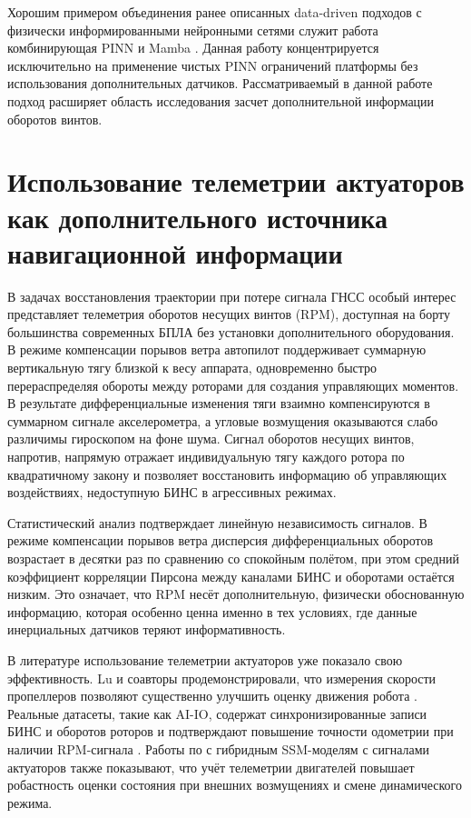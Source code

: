 Хорошим примером объединения ранее описанных data-driven подходов с физически информированными нейронными сетями служит работа комбинирующая PINN и Mamba \cite{HangZhou2026}. Данная работу концентрируется исключительно на применение чистых PINN ограничений платформы без использования дополнительных датчиков. Рассматриваемый в данной работе подход расширяет область исследования засчет дополнительной информации оборотов винтов. 


\section{Использование телеметрии актуаторов как дополнительного источника навигационной информации}
\label{sec:1.6}

В задачах восстановления траектории при потере сигнала ГНСС особый интерес представляет телеметрия оборотов несущих винтов (RPM), доступная на борту большинства современных БПЛА без установки дополнительного оборудования. В режиме компенсации порывов ветра автопилот поддерживает суммарную вертикальную тягу близкой к весу аппарата, одновременно быстро перераспределяя обороты между роторами для создания управляющих моментов. В результате дифференциальные изменения тяги взаимно компенсируются в суммарном сигнале акселерометра, а угловые возмущения оказываются слабо различимы гироскопом на фоне шума. Сигнал оборотов несущих винтов, напротив, напрямую отражает индивидуальную тягу каждого ротора по квадратичному закону и позволяет восстановить информацию об управляющих воздействиях, недоступную БИНС в агрессивных режимах.

Статистический анализ подтверждает линейную независимость сигналов. В режиме компенсации порывов ветра дисперсия дифференциальных оборотов возрастает в десятки раз по сравнению со спокойным полётом, при этом средний коэффициент корреляции Пирсона между каналами БИНС и оборотами остаётся низким. Это означает, что RPM несёт дополнительную, физически обоснованную информацию, которая особенно ценна именно в тех условиях, где данные инерциальных датчиков теряют информативность.

В литературе использование телеметрии актуаторов уже показало свою эффективность. Lu и соавторы продемонстрировали, что измерения скорости пропеллеров позволяют существенно улучшить оценку движения робота \cite{Lu2022rpm}. Реальные датасеты, такие как AI-IO, содержат синхронизированные записи БИНС и оборотов роторов и подтверждают повышение точности одометрии при наличии RPM-сигнала \cite{aiio2026}. Работы по с гибридным SSM-моделям с сигналами актуаторов также показывают, что учёт телеметрии двигателей повышает робастность оценки состояния при внешних возмущениях и смене динамического режима.

